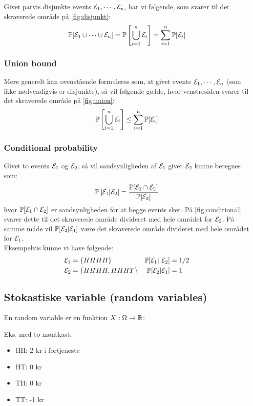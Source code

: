 Givet parvis disjunkte events ${\mathcal{E}}_1, \cdots, {\mathcal{E}}_n$, har vi følgende, som svarer til det skraverede område på \ref{fig:disjunkt}:
\begin{align} \label{eq:disjunkt}
{\mathbb P}[{\mathcal{E}}_1 \cup \cdots \cup {\mathcal{E}}_n] = {\mathbb P} \left[ \bigcup_{i=1}^n {\mathcal{E}}_i \right] = \sum_{i=1}^{n} {\mathbb P}[{\mathcal{E}}_i]
\end{align}

\subsubsection{Union bound}
Mere generelt kan ovenstående formuleres som, at givet events ${\mathcal{E}}_1, \cdots, {\mathcal{E}}_n$ (som ikke nødvendigvis er disjunkte), så vil følgende gælde, hvor venstresiden svarer til det skraverede område på \ref{fig:union}:
\begin{align} \label{eq:union-bound}
{\mathbb P} \left[ \bigcup_{i=1}^n {\mathcal{E}}_i \right] \leq \sum_{i=1}^{n} {\mathbb P}[{\mathcal{E}}_i]
\end{align}

\subsubsection{Conditional probability}
Givet to events ${\mathcal{E}}_1$ og ${\mathcal{E}}_2$, så vil sandsynligheden af ${\mathcal{E}}_1$ givet ${\mathcal{E}}_2$ kunne beregnes som:
\begin{align}
{\mathbb P} \left[ {\mathcal{E}}_1 | {\mathcal{E}}_2 \right] = \frac{{\mathbb P}[{\mathcal{E}}_1 \cap {\mathcal{E}}_2]}{{\mathbb P}[{\mathcal{E}}_2]}
\end{align}
hvor ${\mathbb P}[{\mathcal{E}}_1 \cap {\mathcal{E}}_2]$ er sandsynligheden for at begge events sker. På \ref{fig:conditional} svarer dette til det skraverede område divideret med hele området for ${\mathcal{E}}_2$. På samme måde vil ${\mathbb P}[{\mathcal{E}}_2 | {\mathcal{E}}_1]$ være det skraverede område divideret med hele området for ${\mathcal{E}}_1$.\\

Eksempelvis kunne vi have følgende:
\begin{align*}
\E_1 &= \curly{HHHH}       &\P[\E_1 | \E_2] &= 1/2\\
\E_2 &= \curly{HHHH, HHHT} &\P[\E_2 | \E_1] &= 1
\end{align*}

\subsection{Stokastiske variable (random variables)}
En random variable er en funktion $X: \Omega \rightarrow {\mathbb R}$:

Eks. med to møntkast:
\begin{itemize}
	\item HH: 2 kr i fortjeneste
	\item HT: 0 kr
	\item TH: 0 kr
	\item TT: -1 kr
\end{itemize}

